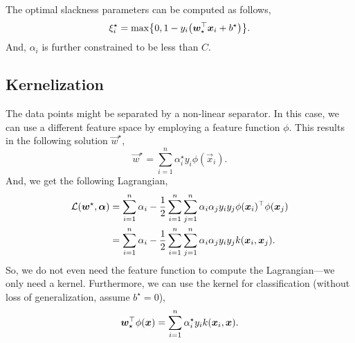 The optimal slackness parameters can be computed as follows, \[
    \xi_i^\star = \max \lft\{ 0, 1 - y_i \lft( \transpose{\vec{w}_\star} \vec{x}_i + b^\star \rgt) \rgt\}.
\]
And, $\alpha_i$ is further constrained to be less than $C$.

\subsection{Kernelization}

The data points might be separated by a non-linear separator. In this case, we can use a different
feature space by employing a feature function $\phi$. This results in the following solution
$\vec{w}^\star$, \[
    \vec{w}^\star = \sum_{i=1}^{n} \alpha_i^\star y_i \phi(\vec{x}_i).
\]
And, we get the following Lagrangian,
\begin{align*}
    \mathcal{L}(\bm{w}^\star, \bm{\alpha}) & = \sum_{i=1}^{n} \alpha_i - \frac{1}{2} \sum_{i=1}^{n} \sum_{j=1}^{n} \alpha_i \alpha_j y_i y_j \phi(\bm{x}_i)^\top \phi(\bm{x}_j) \\
                                             & = \sum_{i=1}^{n} \alpha_i - \frac{1}{2} \sum_{i=1}^{n} \sum_{j=1}^{n} \alpha_i \alpha_j y_i y_j k(\bm{x}_i, \bm{x}_j).
\end{align*}
So, we do not even need the feature function to compute the Lagrangian---we only need a kernel.
Furthermore, we can use the kernel for classification (without loss of generalization, assume
$b^\star = 0$), \[
    \bm{w}_\star^\top \phi(\bm{x}) = \sum_{i=1}^{n} \alpha_i^\star y_i k(\bm{x}_i, \bm{x}).
\]
